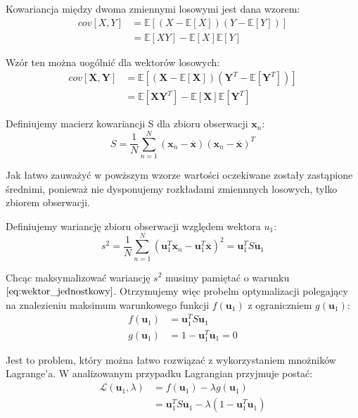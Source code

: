 \documentclass{article}
\newcommand{\bb}{\textbf}
\begin{document}
Kowariancja między dwoma zmiennymi losowymi jest dana wzorem:
\begin{align}	
	cov[X,Y] &= \mathbb{E}[(X - \mathbb{E}[X])(Y - \mathbb{E}[Y])]  \label{eq:cov} \\ 
			 &= \mathbb{E}[XY] - \mathbb{E}[X]\mathbb{E}[Y] \nonumber
\end{align}

Wzór ten można uogólnić dla wektorów losowych:
\begin{align*}
	cov[\textbf{X}, \bb{Y}] &= \mathbb{E}[(\bb{X} - \mathbb{E}[\bb{X}])(\bb{Y}^T - \mathbb{E}[\bb{Y}^T])] \\
							&= \mathbb{E}[\bb{X}\bb{Y}^T] - \mathbb{E}[\bb{X}]\mathbb{E}[\bb{Y}^T]
\end{align*}

Definiujemy macierz kowariancji S dla zbioru obserwacji $\bb{x}_n$:
\begin{equation}
	S = \frac{1}{N} \sum_{n=1}^{N} (\bb{x}_n - \overline{\bb{x}})(\bb{x}_n - \overline{\bb{x}})^T
\end{equation}

Jak łatwo zauważyć w powższym wzorze wartości oczekiwane zostały zastąpione średnimi, ponieważ nie dysponujemy rozkładami zmiennnych losowych, tylko zbiorem obserwacji.

Definiujemy wariancję zbioru obserwacji względem wektora $u_1$:
\begin{equation}
	s^2 = \frac{1}{N} \sum_{n=1}^{N}(\bb{u}_1^T \bb{x}_n - \bb{u}_1^T\overline{\bb{x}})^2 = \bb{u}_1^T S \bb{u}_1
\end{equation}

Chcąc maksymalizować wariancję $s^2$ musimy pamiętać o warunku $\ref{eq:wektor_jednostkowy}$. Otrzymujemy więc probelm optymalizacji polegający na znalezieniu maksimum warunkowego funkcji $f(\bb{u}_1)$ z ograniczniem $g(\bb{u}_1)$:
\begin{align*}
	f(\bb{u}_1) &= \bb{u}_1^T S \bb{u}_1 \\
	g(\bb{u}_1) &= 1 - \bb{u}_1^T \bb{u}_1 = 0
\end{align*}

Jest to problem, który można łatwo rozwiązać z wykorzystaniem mnożników Lagrange'a. W analizowanym przypadku Lagrangian przyjmuje postać:
\begin{align*}
	\mathcal{L}(\bb{u}_1, \lambda) &= f(\bb{u}_1) - \lambda g(\bb{u}_1) \\
				&= \bb{u}_1^T S \bb{u}_1 - \lambda(1 - \bb{u}_1^T \bb{u}_1)
\end{align*}
\end{document}
